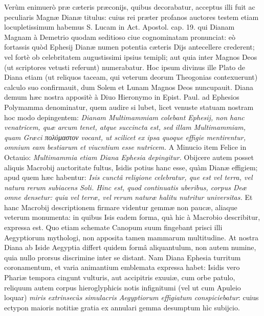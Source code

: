 \documentclass[a4paper, 11pt, oneside, polutonikogreek, latin]{article}
\begin{document}
Verùm enimuerò præ cæteris præconijs, quibus decorabatur, acceptus illi fuit ac peculiaris Magnæ Dianæ titulus: cuius rei præter profanos auctores testem etiam locupletissimum habemus S. Lucam in Act. Apostol. cap. 19. qui Dianam Magnam à Demetrio quodam seditioso ciue cognominatam pronunciat: eò fortassis quòd Ephesij Dianæ numen potentia cæteris Dijs antecellere crederent; vel fortè ob celebritatem augustissimi ipsius temipli; aut quia inter Magnos Deos (ut scriptores vetusti referunt) numerabatur. Hoc ipsum divinus ille Plato de Diana etiam (ut reliquos taceam, qui veterum deorum Theogonias contexuerunt) calculo suo confirmauit, dum Solem et Lunam Magnos Deos nuncupauit. Diana demum hæc nostra appositè à Diuo Hieronymo in Epist. Paul. ad Ephesios Polymamma denominatur, quem audire si lubet, licet venuste statuam nostram hoc modo depingentem: \emph{Dianam Multimammiam colebant Ephesij, non hanc venatricem, quæ arcum tenet, atque succincta est, sed illam Multimammiam, quam Græci πολύμαστον vocant, ut scilicet ex ipsa quoque effigie mentirentur, omnium eam bestiarum et viucntium esse nutricem.} A Minucio item Felice in Octauio: \emph{Multimammia etiam Diana Ephesia depingitur.} Obijcere autem posset aliquis Macrobij auctoritate fultus, Isidis potius hanc esse, quàm Dianæ effigiem; apud quem hæc habentur: \emph{Isis cunctâ religione celebratur, que est vel terra, vel natura rerum subiacens Soli. Hinc est, quod continuatis uberibus, corpus Deæ omne densetur: quia vel terræ, vel rerum naturæ halitu nutritur universitas.} Et hanc Macrobij descriptionem firmare videntur gemmæ non paucæ, aliaque veterum monumenta: in quibus Isis eadem forma, quà hic à Macrobio describitur, expressa est. Quo etiam schemate Canopum suum fingebant prisci illi Aegyptiorum mythologi, non apposita tamen mammarum multitudine. At nostra Diana ab Iside Aegyptia differt quidem formâ aliquantulum, non autem numine, quia nullo prorsus discrimine inter se distant. Nam Diana Ephesia turritum coronamentum, et varia animantium emblemata expressa habet: Isidis vero Phariæ tempora cingunt vulturis, aut accipitris exuuiæ, cum orbe patulo, reliquum autem corpus hieroglyphicis notis infignitumi (vel ut cum Apuleio loquar) \emph{miris extrinsecùs simulacris Aegyptiorum effigiatum conspiciebatur}: cuius ectypon maioris notitiæ gratia ex annulari gemma desumptum hìc subijcio.
\end{document}
